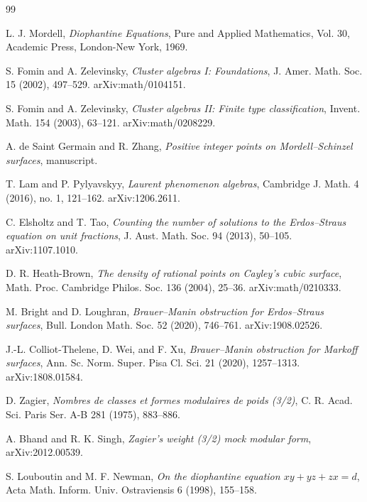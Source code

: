 \clearpage
{}
\hypertarget{bibliography}{}
\begin{thebibliography}{99}

L. J. Mordell, \textit{Diophantine Equations}, Pure and Applied Mathematics,
Vol. 30, Academic Press, London-New York, 1969.

S. Fomin and A. Zelevinsky, \textit{Cluster algebras I: Foundations},
J. Amer. Math. Soc. 15 (2002), 497--529. arXiv:math/0104151.

S. Fomin and A. Zelevinsky, \textit{Cluster algebras II: Finite type
classification}, Invent. Math. 154 (2003), 63--121. arXiv:math/0208229.

A. de Saint Germain and R. Zhang, \textit{Positive integer points on
Mordell--Schinzel surfaces}, manuscript.

T. Lam and P. Pylyavskyy, \textit{Laurent phenomenon algebras},
Cambridge J. Math. 4 (2016), no. 1, 121--162. arXiv:1206.2611.

C. Elsholtz and T. Tao, \textit{Counting the number of solutions to the
Erdos--Straus equation on unit fractions}, J. Aust. Math. Soc. 94 (2013),
50--105. arXiv:1107.1010.

D. R. Heath-Brown, \textit{The density of rational points on Cayley's cubic
surface}, Math. Proc. Cambridge Philos. Soc. 136 (2004), 25--36.
arXiv:math/0210333.

M. Bright and D. Loughran, \textit{Brauer--Manin obstruction for
Erdos--Straus surfaces}, Bull. London Math. Soc. 52 (2020), 746--761.
arXiv:1908.02526.

J.-L. Colliot-Thelene, D. Wei, and F. Xu, \textit{Brauer--Manin obstruction
for Markoff surfaces}, Ann. Sc. Norm. Super. Pisa Cl. Sci. 21 (2020),
1257--1313. arXiv:1808.01584.

D. Zagier, \textit{Nombres de classes et formes modulaires de poids (3/2)},
C. R. Acad. Sci. Paris Ser. A-B 281 (1975), 883--886.

A. Bhand and R. K. Singh, \textit{Zagier's weight (3/2) mock modular form},
arXiv:2012.00539.

S. Louboutin and M. F. Newman, \textit{On the diophantine equation
\(xy+yz+zx=d\)}, Acta Math. Inform. Univ. Ostraviensis 6 (1998), 155--158.


\end{thebibliography}
